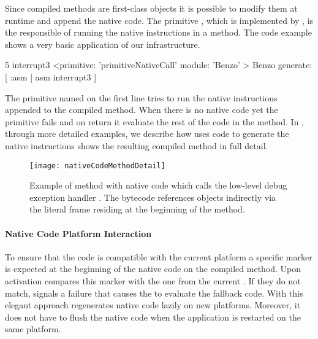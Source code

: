 \noindent Since compiled methods are first-class objects it is possible to modify them at runtime and append the native code.
The primitive , which is implemented by \B, is the responsible of running the native instructions in a \PH method.
The code example  shows a very basic application of our infrastructure.
%
\begin{stcode}[label={lst:benzo-basic-native-code}, caption={\PH method using \B for very basic low-level debugging.}, escapeinside={@}{@}]{5}
interrupt3
	<primitive: 'primitiveNativeCall' 
	 module: 'Benzo' >
	Benzo generate: [ :asm | asm interrupt3 ]
\end{stcode}
%
The primitive named  on the first line tries to run the native instructions appended to the compiled method.
When there is no native code yet the primitive fails and on return it evaluate the rest of the \PH code in the method.
In , through more detailed examples, we describe how \B uses \PH code to generate the native instructions
 shows the resulting compiled method in full detail.
%
\begin{figure}[ht]
    \centering
    \texttt{[image: nativeCodeMethodDetail]}
    \caption[ With \B Code]{Example of \PH method with native code which calls the low-level debug exception handler . The bytecode references objects indirectly via the literal frame residing at the beginning of the method.}
\end{figure}

\paragraph{Native Code Platform Interaction}

To ensure that the code is compatible with the current platform a \VM specific marker is expected at the beginning of the native code on the compiled method.
Upon activation \B compares this marker with the one from the current \VM.
If they do not match, \B signals a failure that causes the \VM to evaluate the fallback \PH code.
With this elegant approach \B regenerates native code lazily on new platforms.
Moreover, it does not have to flush the native code when the application is restarted on the same platform.

